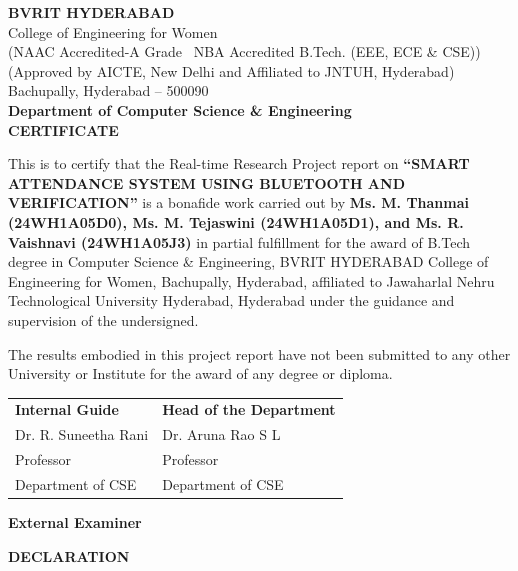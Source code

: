 \documentclass[12pt,a4paper]{report}
\begin{document}
\clearpage
\thispagestyle{empty}
\begin{center}
{\Large \textbf{BVRIT HYDERABAD}}\\
{\large College of Engineering for Women}\\
{\small (NAAC Accredited-A Grade \textbar\ NBA Accredited B.Tech. (EEE, ECE \& CSE))}\\
{\small (Approved by AICTE, New Delhi and Affiliated to JNTUH, Hyderabad)}\\
{\small Bachupally, Hyderabad -- 500090}\\[0.4cm]
{\large \textbf{Department of Computer Science \& Engineering}}\\[0.6cm]
{\Large \textbf{CERTIFICATE}}
\end{center}

This is to certify that the Real-time Research Project report on \textbf{``SMART ATTENDANCE SYSTEM USING BLUETOOTH AND VERIFICATION''} is a bonafide work carried out by \textbf{Ms. M. Thanmai (24WH1A05D0), Ms. M. Tejaswini (24WH1A05D1), and Ms. R. Vaishnavi (24WH1A05J3)} in partial fulfillment for the award of B.Tech degree in Computer Science \& Engineering, BVRIT HYDERABAD College of Engineering for Women, Bachupally, Hyderabad, affiliated to Jawaharlal Nehru Technological University Hyderabad, Hyderabad under the guidance and supervision of the undersigned.

The results embodied in this project report have not been submitted to any other University or Institute for the award of any degree or diploma.

\vspace{1.8cm}
\begin{tabular}{p{}p{}}
\textbf{Internal Guide} & \textbf{Head of the Department} \\
Dr. R. Suneetha Rani & Dr. Aruna Rao S L \\
Professor & Professor \\
Department of CSE & Department of CSE \\
\end{tabular}

\vspace{1.8cm}
\textbf{External Examiner}

\clearpage
\thispagestyle{empty}
\begin{center}
{\Large \textbf{DECLARATION}}
\end{center}
\end{document}
